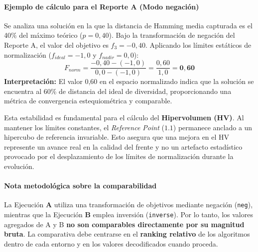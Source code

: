 \documentclass[a4paper,10pt]{article}
\begin{document}
\paragraph{Ejemplo de cálculo para el Reporte A (Modo negación)}
Se analiza una solución en la que la distancia de Hamming media capturada es el 40\% del máximo teórico ($p=0,40$). Bajo la transformación de negación del Reporte A, el valor del objetivo es $f_3 = -0,40$. Aplicando los límites estáticos de normalización ($f_{ideal} = -1,0$ y $f_{nadir} = 0,0$):
\begin{equation}
F_{norm} = \frac{-0,40 - (-1,0)}{0,0 - (-1,0)} = \frac{0,60}{1,0} = \mathbf{0,60}
\end{equation}
\textbf{Interpretación:} El valor 0,60 en el espacio normalizado indica que la solución se encuentra al 60\% de distancia del ideal de diversidad, proporcionando una métrica de convergencia estequiométrica y comparable.

Esta estabilidad es fundamental para el cálculo del \textbf{Hipervolumen (HV)}. Al mantener los límites constantes, el \textit{Reference Point} ($1.1$) permanece anclado a un hipercubo de referencia invariable. Esto asegura que una mejora en el HV represente un avance real en la calidad del frente y no un artefacto estadístico provocado por el desplazamiento de los límites de normalización durante la evolución.

\paragraph{Nota metodológica sobre la comparabilidad}
La Ejecución \textbf{A} utiliza una transformación de objetivos mediante negación (\texttt{neg}), mientras que la Ejecución \textbf{B} emplea inversión (\texttt{inverse}). Por lo tanto, los valores agregados de A y B \textbf{no son comparables directamente por su magnitud bruta}. La comparativa debe centrarse en el \textbf{ranking relativo} de los algoritmos dentro de cada entorno y en los valores decodificados cuando proceda.
\end{document}
